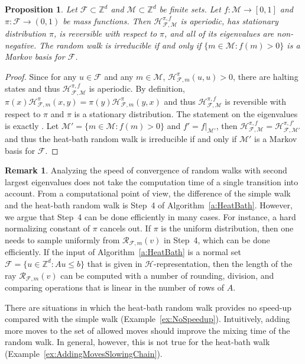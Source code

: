 \documentclass[11pt]{amsart}
\newtheorem{prop}[thm]{Proposition}
\theoremstyle{definition}
\newtheorem{remark}[thm]{Remark}
\numberwithin{equation}{section}
\newcommand{\ring}[1]{\ensuremath{\mathbb{#1}}}
\renewcommand{\>}{\rangle}
\newcommand{\<}{\langle}
\newcommand{\0}{\mathbf{0}}
\newcommand{\1}{\mathbf{1}}
\newcommand{\2}{\mathbf{2}}
\newcommand\ZZ{\ring{Z}}
\newcommand\cF{{\mathcal F}}
\newcommand\cM{{\mathcal M}}
\newcommand{\polyray}[3]{\mathcal{R}_{#3,#2}(#1)}
\newcommand{\heatbath}[4]{\mathcal{H}^{#1,#2}_{#3,#4}}
\newcommand{\heatbathmove}[3]{\mathcal{H}^{#1}_{#2,#3}}
\begin{document}
\begin{prop}\label{p:HeatBath}
Let $\cF\subset\ZZ^d$ and $\cM\subset\ZZ^d$ be finite sets. Let
$f:\cM\to[0,1]$ and $\pi:\cF\to(0,1)$ be mass functions. Then
$\heatbath{\pi}{f}{\cF}{\cM}$ is aperiodic, has stationary
distribution $\pi$, is reversible with respect to $\pi$, and all of
its eigenvalues are non-negative. The random walk is irreducible if
and only if $\{m\in\cM: f(m)>0\}$ is a Markov basis for $\cF$.
\end{prop}
\begin{proof}
Since for any $u\in\cF$ and any $m\in\cM$,
$\heatbathmove{\pi}{\cF}{m}(u,u)>0$, there are halting states and thus
$\heatbath{\pi}{f}{\cF}{\cM}$ is aperiodic.  By definition,
$\pi(x)\heatbathmove{\pi}{\cF}{m}(x,y)=\pi(y)\heatbathmove{\pi}{\cF}{m}(y,x)$
and thus $\heatbath{\pi}{f}{\cF}{\cM}$ is reversible with
respect to $\pi$ and $\pi$ is a stationary distribution.  The
statement on the eigenvalues is exactly \cite[Lemma~1.2]{Dyer2014}.
Let $\cM'=\{m\in\cM: f(m)>0\}$ and $f'=f|_{\cM'}$, then
$\heatbath{\pi}{f}{\cF}{\cM}=\heatbath{\pi}{f'}{\cF}{\cM'}$ and thus the
heat-bath random walk is irreducible if and only if $\cM'$ is a Markov
basis for $\cF$.
\end{proof}

\begin{remark}\label{r:ExecutionHeatBath}
Analyzing the speed of convergence of random walks with second largest
eigenvalues does not take the computation time of a single transition
into account. From a computational point of view, the
difference of the simple walk and the heat-bath random walk is 
Step~4 of Algorithm~\ref{a:HeatBath}. However, we argue that Step~4
can be done efficiently in many cases. For instance, a hard
normalizing constant of $\pi$ cancels out. If $\pi$ is the uniform
distribution, then one needs to sample uniformly from
$\polyray{v}{m}{\cF}$ in Step~4, which can be done efficiently. If the
input of Algorithm~\ref{a:HeatBath} is a normal set $\cF=\{u\in\ZZ^d:
Au\le b\}$ that is given in $\mathcal{H}$-representation, then the
length of the ray $\polyray{v}{m}{\cF}$ can be computed with a number
of rounding, division, and comparing operations that is linear in the
number of rows of $A$.  
\end{remark}

There are situations in which the heat-bath random walk provides no
speed-up compared with the simple walk (Example~\ref{ex:NoSpeedup}).
Intuitively, adding more moves to the set of allowed moves should
improve the mixing time of the random walk. In general, however, this
is not true for the heat-bath walk
(Example~\ref{ex:AddingMovesSlowingChain}).
\end{document}
